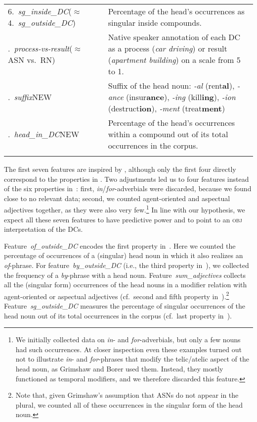 \documentclass[output=paper]{langsci/langscibook}
\begin{document}
\begin{table}
\begin{tabularx}{\textwidth}{p{3.25cm}Q}
6.\ \textit{sg\_inside\_DC}\newline($\approx$ 4.~\textit{sg\_outside\_DC}) & Percentage of the head's occurrences as singular inside compounds.\\.\ \textit{process-vs-result}\newline($\approx$ ASN vs.~RN) & Native speaker annotation of each DC as a process (\textit{car driving}) or result (\textit{apartment building})  on a scale from 5 to 1.\\.\ \textit{suffix}\newline NEW & Suffix of the head noun: \textit{-al} (rent\textbf{al}), \textit{-ance} (insur\textbf{ance}), \textit{-ing} (kill\textbf{ing}), \textit{-ion} (destruct\textbf{ion}), \textit{-ment} (treat\textbf{ment})\\.\ \textit{head\_in\_DC}\newline NEW & Percentage of the head's occurrences within a compound out of its total occurrences in the corpus.\\ \lspbottomrule
\end{tabularx}
\end{table}


The first seven features are inspired by \cite{grimshaw:90}, although only the first four directly correspond to the properties in . Two adjustments led us to four features instead of the six properties in~: first, \textit{in}/\textit{for}-ad\-ver\-bi\-als were discarded, because we found close to no relevant data; second, we counted agent-oriented and aspectual adjectives together, as they were also very few.\footnote{We initially collected data on \textit{in}- and \textit{for}-adverbials, but only a few nouns had such occurrences. At closer inspection even these examples turned out not to illustrate \textit{in}- and \textit{for}-phrases that modify the telic/atelic aspect of the head noun, as Grimshaw and Borer used them. Instead, they mostly functioned as temporal modifiers, and we therefore discarded this feature.}  In line with our hypothesis, we expect all these seven features to have predictive power and to point to an \textsc{obj} interpretation of the DCs.

Feature~\textit{of\_outside\_DC} encodes the first property in~. Here we counted the percentage of occurrences of a (singular) head noun in which it also realizes an  \textit{of}-phrase. For feature~\textit{by\_outside\_DC} (i.e., the third property in~), we collected the frequency of a \textit{by}-phrase with a head noun. Feature~\textit{sum\_adjectives} collects all the (singular form) occurrences of the head nouns in a modifier relation with agent-oriented or aspectual adjectives (cf.~second and fifth property in~).\footnote{Note that, given Grimshaw's assumption that ASNs do not appear in the plural, we counted all of these occurrences in the singular form of the head noun.} Feature~\textit{sg\_outside\_DC} measures the percentage of singular occurrences of the head noun out of its total occurrences in the corpus {(cf.~last property in~)}. 
\end{document}
